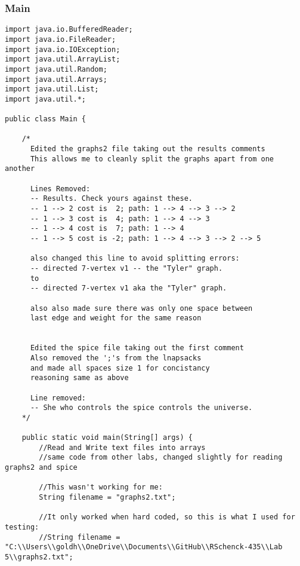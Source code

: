\documentclass[10pt]{article}
\begin{document}
\subsubsection{Main}
\lstset{numbers=left, numberstyle=\tiny, stepnumber=1, numbersep=5pt, basicstyle=\footnotesize\ttfamily}
\begin{lstlisting}[frame=single, ]  
import java.io.BufferedReader;
import java.io.FileReader;
import java.io.IOException;
import java.util.ArrayList;
import java.util.Random;
import java.util.Arrays;
import java.util.List;
import java.util.*;

public class Main {

    /* 
      Edited the graphs2 file taking out the results comments
      This allows me to cleanly split the graphs apart from one another

      Lines Removed:
      -- Results. Check yours against these.
      -- 1 --> 2 cost is  2; path: 1 --> 4 --> 3 --> 2
      -- 1 --> 3 cost is  4; path: 1 --> 4 --> 3
      -- 1 --> 4 cost is  7; path: 1 --> 4
      -- 1 --> 5 cost is -2; path: 1 --> 4 --> 3 --> 2 --> 5

      also changed this line to avoid splitting errors:
      -- directed 7-vertex v1 -- the "Tyler" graph.
      to
      -- directed 7-vertex v1 aka the "Tyler" graph.

      also also made sure there was only one space between
      last edge and weight for the same reason


      Edited the spice file taking out the first comment
      Also removed the ';'s from the lnapsacks 
      and made all spaces size 1 for concistancy
      reasoning same as above

      Line removed:
      -- She who controls the spice controls the universe.
    */

    public static void main(String[] args) {
        //Read and Write text files into arrays
        //same code from other labs, changed slightly for reading graphs2 and spice

        //This wasn't working for me: 
        String filename = "graphs2.txt";

        //It only worked when hard coded, so this is what I used for testing:
        //String filename = "C:\\Users\\goldh\\OneDrive\\Documents\\GitHub\\RSchenck-435\\Lab 5\\graphs2.txt";


\end{lstlisting}
\end{document}
